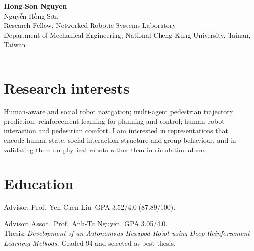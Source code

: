 \documentclass[10pt]{article}
\begin{document}
{\fontsize{22}{26}\selectfont\bfseries Hong-Son Nguyen}\\[2pt]
{\color{muted}\fontsize{10.5}{13}\selectfont Nguyễn Hồng Sơn}\\[7pt]
{\fontsize{10}{14}\selectfont
Research Fellow, Networked Robotic Systems Laboratory\\
Department of Mechanical Engineering, National Cheng Kung University, Tainan, Taiwan}\\[8pt]
{\fontsize{9.4}{14}\selectfont
{} \quad
{} \quad
{}\\[2pt]
 \quad
{} \quad
{} \quad
{}}

\section{Research interests}
{\fontsize{9.8}{12.6}\selectfont
Human-aware and social robot navigation; multi-agent pedestrian trajectory
prediction; reinforcement learning for planning and control; human--robot
interaction and pedestrian comfort. I am interested in representations that
encode human state, social interaction structure and group behaviour, and in
validating them on physical robots rather than in simulation alone.}

\section{Education}

\begin{detail}
Advisor: Prof.\ Yen-Chen Liu. \quad GPA 3.52/4.0 (87.89/100).
\end{detail}

\begin{detail}
Advisor: Assoc.\ Prof.\ Anh-Tu Nguyen. \quad GPA 3.05/4.0.\\
Thesis: \emph{Development of an Autonomous Hexapod Robot using Deep
Reinforcement Learning Methods.} Graded 94 and selected as best thesis.
\end{detail}
\end{document}
